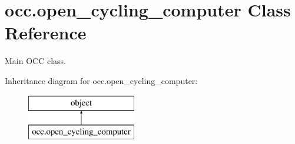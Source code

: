 \hypertarget{classocc_1_1open__cycling__computer}{}\section{occ.\+open\+\_\+cycling\+\_\+computer Class Reference}
\label{classocc_1_1open__cycling__computer}


Main O\+CC class.  


Inheritance diagram for occ.\+open\+\_\+cycling\+\_\+computer\+:\begin{figure}[H]
\begin{center}
\leavevmode
\includegraphics[height=2.000000cm]{classocc_1_1open__cycling__computer}
\end{center}
\end{figure}
